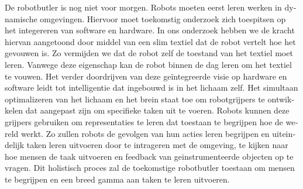 \documentclass[\home/main.tex]{subfiles}
\begin{document}
\begin{otherlanguage}{dutch}
De robotbutler is nog niet voor morgen. Robots moeten eerst leren werken in dynamische omgevingen. Hiervoor moet toekomstig onderzoek zich toespitsen op het integereren van software en hardware. In ons onderzoek hebben we de kracht hiervan aangetoond door middel van een slim textiel dat de robot vertelt hoe het gevouwen is. Zo vermijden we dat de robot zelf de toestand van het textiel moet leren. Vanwege deze eigenschap kan de robot binnen de dag leren om het textiel te vouwen.
Het verder doordrijven van deze geïntegreerde visie op hardware en software leidt tot intelligentie dat ingebouwd is in het lichaam zelf. Het simultaan optimalizeren van het lichaam en het brein staat toe om robotgrijpers te ontwikkelen dat aangepast zijn om specifieke taken uit te voeren. Robots kunnen deze grijpers gebruiken om representaties te leren dat toestaan te begrijpen hoe de wereld werkt. Zo zullen robots de gevolgen van hun acties leren begrijpen en uiteindelijk taken leren uitvoeren door te intrageren met de omgeving, te kijken naar hoe mensen de taak uitvoeren en feedback van geinstrumenteerde objecten op te vragen. 
Dit holistisch proces zal de toekomstige robotbutler toestaan om mensen te begrijpen en een breed gamma aan taken te leren uitvoeren. 

\end{otherlanguage}
\end{document}
